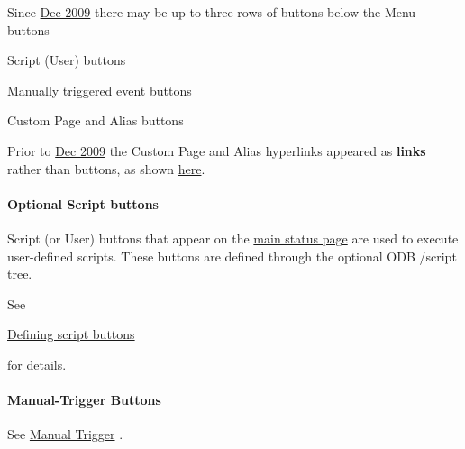  Since \hyperlink{NDF_ndf_dec_2009}{Dec 2009}  there may be up to three rows of buttons below the Menu buttons
\begin{DoxyItemize}
\item Script (User) buttons
\item Manually triggered event buttons
\item Custom Page and Alias buttons
\end{DoxyItemize}

 Prior to \hyperlink{NDF_ndf_dec_2009}{Dec 2009}  the Custom Page and Alias hyperlinks appeared as {\bfseries links} rather than buttons, as shown \hyperlink{RC_mhttpd_status_page_redesign_RC_mhttpd_old_alias_buttons}{here}.

\par


\par
 \label{RC_mhttpd_status_page_features_idx_mhttpd_buttons_script}
\hypertarget{RC_mhttpd_status_page_features_idx_mhttpd_buttons_script}{}
 \hypertarget{RC_mhttpd_status_page_features_RC_mhttpd_status_script_buttons}{}\paragraph{Optional Script buttons}\label{RC_mhttpd_status_page_features_RC_mhttpd_status_script_buttons}
Script (or User) buttons that appear on the \hyperlink{RC_mhttpd_status_page_features_RC_mhpptd_optional_buttons}{main status page} are used to execute user-\/defined scripts. These buttons are defined through the optional ODB /script tree.

See
\begin{DoxyItemize}
\item \hyperlink{RC_mhttpd_defining_script_buttons}{Defining script buttons}
\end{DoxyItemize}

for details.

\par


\par
 \label{RC_mhttpd_status_page_features_idx_manual-trigger_button}
\hypertarget{RC_mhttpd_status_page_features_idx_manual-trigger_button}{}
 \hypertarget{RC_mhttpd_status_page_features_RC_mhttpd_status_Manual_Trigger_buttons}{}\paragraph{Manual-\/Trigger Buttons}\label{RC_mhttpd_status_page_features_RC_mhttpd_status_Manual_Trigger_buttons}
See \hyperlink{FE_eq_event_routines_FE_manual_trigger}{Manual Trigger} .

